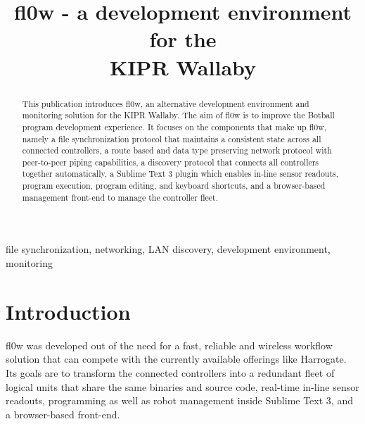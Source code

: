 \documentclass[conference,a4paper]{IEEEtran}
\begin{document}
\title{fl0w - a development environment for the\\ KIPR Wallaby}
\author{
}
\maketitle

\begin{abstract}
This publication introduces fl0w, an alternative development environment and monitoring solution for the KIPR Wallaby. The aim of fl0w is to improve the Botball program development experience. It focuses on the components that make up fl0w, namely a file synchronization protocol that maintains a consistent state across all connected controllers, a route based and data type preserving network protocol with peer-to-peer piping capabilities, a discovery protocol that connects all controllers together automatically, a Sublime Text 3 plugin which enables in-line sensor readouts, program execution, program editing, and keyboard shortcuts, and a browser-based management front-end to manage the controller fleet.\\
\end{abstract}

\begin{IEEEkeywords}
file synchronization, networking, LAN discovery, development environment, monitoring
\end{IEEEkeywords}



\section{Introduction}
fl0w\cite{fl0w:Philip Trauner} was developed out of the need for a fast, reliable and wireless workflow solution that can compete with the currently available offerings like Harrogate\cite{Harrogate:KIPR}. Its goals are to transform the connected controllers into a redundant fleet of logical units that share the same binaries and source code, real-time in-line sensor readouts, programming as well as robot management inside Sublime Text 3\cite{Sublime Text 3:Sublime HQ}, and a browser-based front-end.
\end{document}
